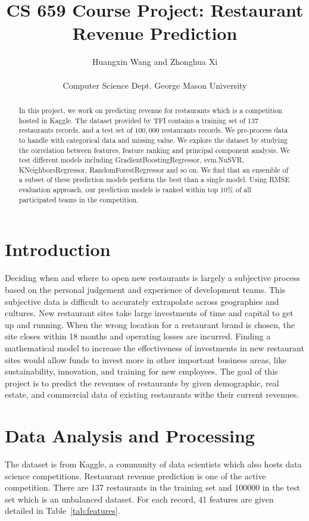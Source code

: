 \documentclass[10pt, oneside]{article}   	%
\title{CS 659 Course Project: Restaurant Revenue Prediction}
\author{Huangxin Wang and Zhonghua Xi \\
\\
Computer Science Dept. George Mason University}
\newcommand\tabref{Table~\ref}
\begin{document}
\maketitle

\begin{abstract}
In this project, we work on predicting revenue for restaurants which is a competition hosted in Kaggle. The dataset provided by TFI contains a training set of  $137$ restaurants records, and a test set of $100, 000$  restaurants records. We pre-process data to handle with categorical data and missing value. We explore the dataset by studying the correlation between features, feature ranking and principal component analysis. We test different models including GradientBoostingRegressor, svm.NuSVR, KNeighborsRegressor, RandomForestRegressor and so on. We find that an ensemble of a subset of these prediction models perform the best than a single model. Using RMSE evaluation approach, our prediction models is ranked within top $10\%$ of all participated teams in the competition.
\end{abstract}

\section{Introduction}
Deciding when and where to open new restaurants is largely a subjective process based on the personal judgement and experience of development teams. 
This subjective data is difficult to accurately extrapolate across geographies and cultures.
New restaurant sites take large investments of time and capital to get up and running. 
When the wrong location for a restaurant brand is chosen, the site closes within 18 months and operating losses are incurred. 
Finding a mathematical model to increase the effectiveness of investments in new restaurant sites would allow funds to invest more in other important business areas, like sustainability, innovation, and training for new employees.
The goal of this project is to predict the revenues of restaurants by given demographic, real estate, and commercial data of existing restaurants withe their current revenues.

\section{Data Analysis and Processing}
The dataset is from Kaggle, a community of data scientists which also hosts data science competitions. 
Restaurant revenue prediction is one of the active competition.
There are 137 restaurants in the training set and 100000 in the test set which is an unbalanced dataset. 
For each record, 41 features are given detailed in \tabref{tab:features}.
\end{document}
